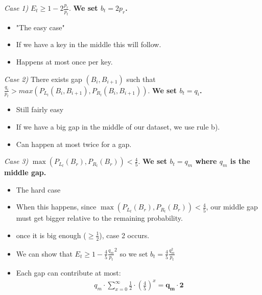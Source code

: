\documentclass[]{beamer}
\theoremstyle{plain}
\begin{document}
\begin{frame}

\textit{Case 1)} $E_t \geq 1-2 \frac{p_r}{p_t}$. \textbf{We set $b_t = 2p_r$.}


\begin{itemize}
\item "The easy case"
\item If we have a key in the middle this will follow.
\item Happens at most once per key.
\end{itemize}

\end{frame}
\begin{frame}
\textit{Case 2)} There exists gap $(B_i, B_{i+1})$ such that $\frac{q_i}{p_t} > max(P_{L_t}(B_i, B_{i+1}), P_{R_t}(B_i, B_{i+1}))$. \textbf{We set $b_t = q_i$.}
\begin{itemize}
\item Still fairly easy
\item If we have a big gap in the middle of our dataset, we use rule b).
\item Can happen at most twice for a gap.
\end{itemize}
\end{frame}

\begin{frame}
\textit{Case 3)} $\max(P_{L_t}(B_r), P_{R_t}(B_r)) < \frac{4}{5}$. \textbf{We set $b_t = q_m$ where $q_m$ is the middle gap.}

\begin{itemize}
\item The hard case
\item When this happens, since $\max(P_{L_t}(B_r), P_{R_t}(B_r)) < \frac{4}{5}$, our middle gap must get bigger relative to the remaining probability.
\item once it is big enough ($\geq \frac{1}{2}$), case 2 occurs.
\item We can show that $E_t \geq 1 - \frac{4}{5}\frac{q_m}{p_t}^2$ so we set $b_t = \frac{4}{5}\frac{q_m^2}{p_t}$ 
\item Each gap can contribute at most:
\begin{align*}
q_m \cdot \sum\limits_{x=0}^{\infty} \frac{1}{2} \cdot (\frac{4}{5}) ^ x = \mathbf{q_m \cdot 2}
\end{align*}
\end{itemize}

\end{frame}
\end{document}
